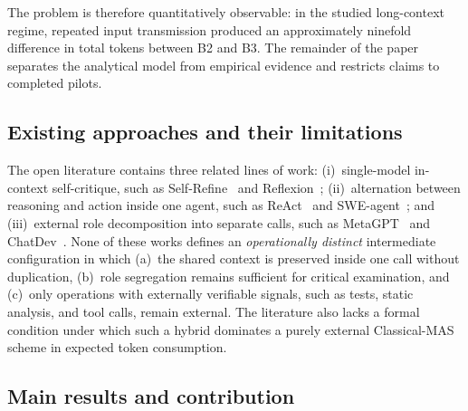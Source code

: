 The problem is therefore quantitatively observable: in the studied long-context regime, repeated input transmission produced an approximately ninefold difference in total tokens between B2 and B3. The remainder of the paper separates the analytical model from empirical evidence and restricts claims to completed pilots.

\subsection{Existing approaches and their limitations}

The open literature contains three related lines of work: (i)~single-model in-context self-critique, such as Self-Refine~\cite{madaan2023selfrefine} and Reflexion~\cite{shinn2023reflexion}; (ii)~alternation between reasoning and action inside one agent, such as ReAct~\cite{yao2022react} and SWE-agent~\cite{yang2024sweagent}; and (iii)~external role decomposition into separate calls, such as MetaGPT~\cite{hong2023metagpt} and ChatDev~\cite{qian2023chatdev}. None of these works defines an \emph{operationally distinct} intermediate configuration in which (a)~the shared context is preserved inside one call without duplication, (b)~role segregation remains sufficient for critical examination, and (c)~only operations with externally verifiable signals, such as tests, static analysis, and tool calls, remain external. The literature also lacks a formal condition under which such a hybrid dominates a purely external \textrm{Classical-MAS} scheme in expected token consumption.

\subsection{Main results and contribution}


